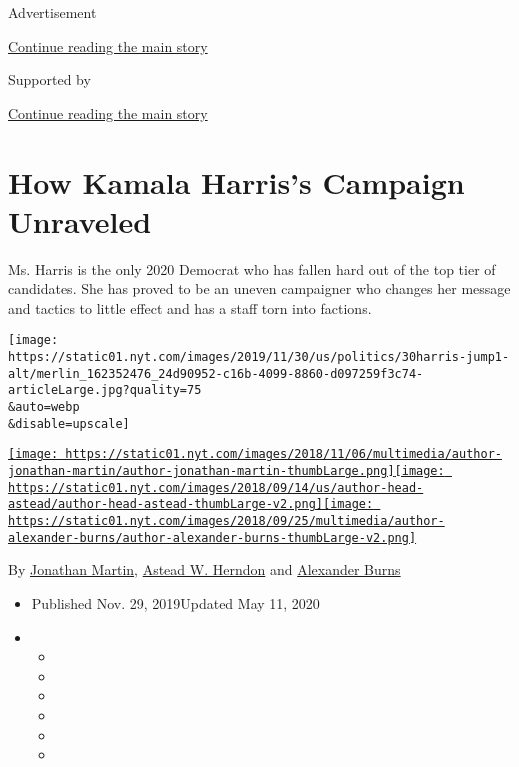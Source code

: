 Advertisement

\protect\hyperlink{after-top}{Continue reading the main story}

Supported by

\protect\hyperlink{after-sponsor}{Continue reading the main story}

\hypertarget{how-kamala-harriss-campaign-unraveled}{%
\section{How Kamala Harris's Campaign
Unraveled}\label{how-kamala-harriss-campaign-unraveled}}

Ms. Harris is the only 2020 Democrat who has fallen hard out of the top
tier of candidates. She has proved to be an uneven campaigner who
changes her message and tactics to little effect and has a staff torn
into factions.

\texttt{[image: https://static01.nyt.com/images/2019/11/30/us/politics/30harris-jump1-alt/merlin\_162352476\_24d90952-c16b-4099-8860-d097259f3c74-articleLarge.jpg?quality=75\\\&auto=webp\\\&disable=upscale]}

\href{https://www.nytimes.com/by/jonathan-martin}{\texttt{[image: https://static01.nyt.com/images/2018/11/06/multimedia/author-jonathan-martin/author-jonathan-martin-thumbLarge.png]}}\href{https://www.nytimes.com/by/astead-w-herndon}{\texttt{[image: https://static01.nyt.com/images/2018/09/14/us/author-head-astead/author-head-astead-thumbLarge-v2.png]}}\href{https://www.nytimes.com/by/alexander-burns}{\texttt{[image: https://static01.nyt.com/images/2018/09/25/multimedia/author-alexander-burns/author-alexander-burns-thumbLarge-v2.png]}}

By \href{https://www.nytimes.com/by/jonathan-martin}{Jonathan Martin},
\href{https://www.nytimes.com/by/astead-w-herndon}{Astead W. Herndon}
and \href{https://www.nytimes.com/by/alexander-burns}{Alexander Burns}

\begin{itemize}
\item
  Published Nov. 29, 2019Updated May 11, 2020
\item
  \begin{itemize}
  \item
  \item
  \item
  \item
  \item
  \item
  \end{itemize}
\end{itemize}

